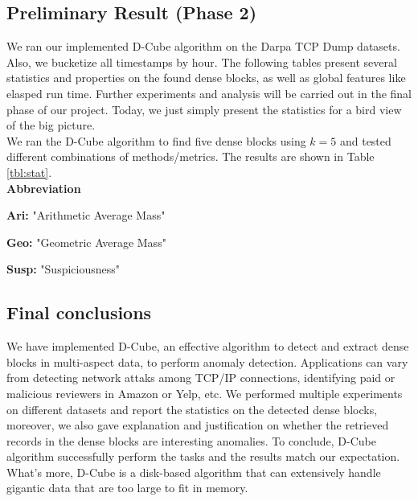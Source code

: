 


\subsection{Preliminary Result (Phase 2)}

We ran our implemented D-Cube algorithm on the Darpa TCP Dump datasets. Also, we bucketize all timestamps by hour. The following tables present several statistics and properties on the found dense blocks, as well as global features like elasped run time. 
Further experiments and analysis will be carried out in the final phase of our project. Today, we just simply present the statistics for a bird view of the big picture. \\
We ran the D-Cube algorithm to find five dense blocks using $k = 5$ and tested different combinations of methods/metrics. The results are shown in Table \ref{tbl:stat}.\\ 

\textbf{Abbreviation}
\bit
\setlength\itemsep{0.8em}
\item \textbf{Ari:} "Arithmetic Average Mass" 
\item \textbf{Geo:} "Geometric Average Mass" 
\item \textbf{Susp:} "Suspiciousness"
\eit

\subsection{Final conclusions}

We have implemented D-Cube, an effective algorithm to detect and extract dense blocks in multi-aspect data, to perform anomaly detection. Applications can vary from detecting network attaks among TCP/IP connections, identifying paid or malicious reviewers in Amazon or Yelp, etc. We performed multiple experiments on different datasets and report the statistics on the detected dense blocks, moreover, we also gave explanation and justification on whether the retrieved records in the dense blocks are interesting anomalies. To conclude, D-Cube algorithm successfully perform the tasks and the results match our expectation. What's more, D-Cube is a disk-based algorithm that can extensively handle gigantic data that are too large to fit in memory. 

